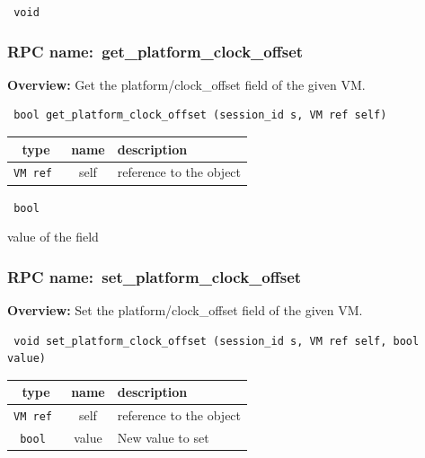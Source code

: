 \vspace{0.3cm}

{\tt 
void
}



\vspace{0.3cm}
\vspace{0.3cm}
\vspace{0.3cm}
\subsubsection{RPC name:~get\_platform\_clock\_offset}

{\bf Overview:} 
Get the platform/clock\_offset field of the given VM.

\begin{verbatim} bool get_platform_clock_offset (session_id s, VM ref self)\end{verbatim}



 
\vspace{0.3cm}
\begin{tabular}{|c|c|p{7cm}|}
 \hline
{\bf type} & {\bf name} & {\bf description} \\ \hline
{\tt VM ref } & self & reference to the object \\ \hline 

\end{tabular}

\vspace{0.3cm}

{\tt 
bool
}


value of the field
\vspace{0.3cm}
\vspace{0.3cm}
\vspace{0.3cm}
\subsubsection{RPC name:~set\_platform\_clock\_offset}

{\bf Overview:} 
Set the platform/clock\_offset field of the given VM.

\begin{verbatim} void set_platform_clock_offset (session_id s, VM ref self, bool value)\end{verbatim}



 
\vspace{0.3cm}
\begin{tabular}{|c|c|p{7cm}|}
 \hline
{\bf type} & {\bf name} & {\bf description} \\ \hline
{\tt VM ref } & self & reference to the object \\ \hline 

{\tt bool } & value & New value to set \\ \hline 

\end{tabular}

